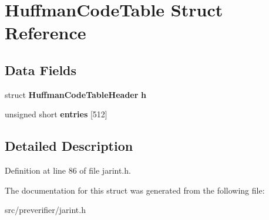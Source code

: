 \section{HuffmanCodeTable Struct Reference}
\label{struct_huffman_code_table}
\subsection*{Data Fields}
\begin{DoxyCompactItemize}
\item 
struct {\bf HuffmanCodeTableHeader} {\bfseries h}\label{struct_huffman_code_table_ad461c314fac0e8b65d6785c7eb94e8b6}

\item 
unsigned short {\bfseries entries} [512]\label{struct_huffman_code_table_a88f84d15c03a561b3ede19696be8b41e}

\end{DoxyCompactItemize}


\subsection{Detailed Description}


Definition at line 86 of file jarint.h.



The documentation for this struct was generated from the following file:\begin{DoxyCompactItemize}
\item 
src/preverifier/jarint.h\end{DoxyCompactItemize}
